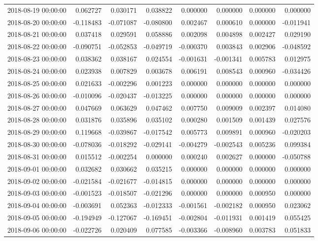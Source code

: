 \begin{tabular}{lrrrrrrr}
2018-08-19 00:00:00 & 0.062727 & 0.030171 & 0.038822 & 0.000000 & 0.000000 & 0.000000 & 0.000000 \\
2018-08-20 00:00:00 & -0.118483 & -0.071087 & -0.080800 & 0.002467 & 0.000610 & 0.000000 & -0.011941 \\
2018-08-21 00:00:00 & 0.037418 & 0.029591 & 0.058886 & 0.002098 & 0.004898 & 0.002427 & 0.029190 \\
2018-08-22 00:00:00 & -0.090751 & -0.052853 & -0.049719 & -0.000370 & 0.003843 & 0.002906 & -0.048592 \\
2018-08-23 00:00:00 & 0.038362 & 0.038167 & 0.024554 & -0.001631 & -0.001341 & 0.005783 & 0.012975 \\
2018-08-24 00:00:00 & 0.023938 & 0.007829 & 0.003678 & 0.006191 & 0.008543 & 0.000960 & -0.034426 \\
2018-08-25 00:00:00 & 0.021633 & -0.002296 & 0.001223 & 0.000000 & 0.000000 & 0.000000 & 0.000000 \\
2018-08-26 00:00:00 & -0.010096 & -0.020437 & -0.013225 & 0.000000 & 0.000000 & 0.000000 & 0.000000 \\
2018-08-27 00:00:00 & 0.047669 & 0.063629 & 0.047462 & 0.007750 & 0.009009 & 0.002397 & 0.014080 \\
2018-08-28 00:00:00 & 0.031876 & 0.035896 & 0.035102 & 0.000280 & 0.001509 & 0.001439 & 0.027576 \\
2018-08-29 00:00:00 & 0.119668 & -0.039867 & -0.017542 & 0.005773 & 0.009891 & 0.000960 & -0.020203 \\
2018-08-30 00:00:00 & -0.078036 & -0.018292 & -0.029141 & -0.004279 & -0.002543 & 0.005236 & 0.099384 \\
2018-08-31 00:00:00 & 0.015512 & -0.002254 & 0.000000 & 0.000240 & 0.002627 & 0.000000 & -0.050788 \\
2018-09-01 00:00:00 & 0.032682 & 0.030662 & 0.035215 & 0.000000 & 0.000000 & 0.000000 & 0.000000 \\
2018-09-02 00:00:00 & -0.021584 & -0.021677 & -0.014815 & 0.000000 & 0.000000 & 0.000000 & 0.000000 \\
2018-09-03 00:00:00 & -0.001523 & -0.018507 & -0.021296 & 0.000000 & 0.000000 & 0.000950 & 0.000000 \\
2018-09-04 00:00:00 & -0.003691 & 0.052363 & -0.012333 & -0.001561 & -0.002182 & 0.000950 & 0.023062 \\
2018-09-05 00:00:00 & -0.194949 & -0.127067 & -0.169451 & -0.002804 & -0.011931 & 0.001419 & 0.055425 \\
2018-09-06 00:00:00 & -0.022726 & 0.020409 & 0.077585 & -0.003366 & -0.008960 & 0.003783 & 0.051833 \\

\end{tabular}
